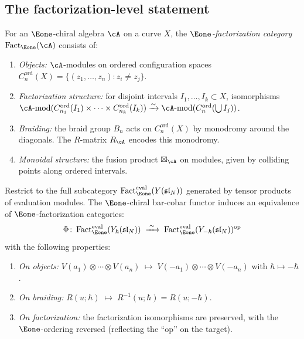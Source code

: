 \subsection{The factorization-level statement}

\begin{definition}
\label{def:e1-factorization-category}
For an $\Eone$-chiral algebra $\cA$ on a curve $X$, the
\emph{$\Eone$-factorization category}
$\operatorname{Fact}_{\Eone}(\cA)$ consists of:
\begin{enumerate}[label=\textup{(\roman*)}]
\item \emph{Objects:} $\cA$-modules on ordered configuration spaces
  $C_n^{\mathrm{ord}}(X) = \{(z_1, \ldots, z_n) : z_i \neq z_j\}$.
\item \emph{Factorization structure:} for disjoint intervals
  $I_1, \ldots, I_k \subset X$, isomorphisms
  $\cA\text{-mod}(C_{n_1}^{\mathrm{ord}}(I_1) \times \cdots
  \times C_{n_k}^{\mathrm{ord}}(I_k))
  \xrightarrow{\sim}
  \cA\text{-mod}(C_n^{\mathrm{ord}}(\bigcup I_j))$.
\item \emph{Braiding:} the braid group $B_n$ acts on
  $C_n^{\mathrm{ord}}(X)$ by monodromy around the diagonals.
  The $R$-matrix $R_\cA$ encodes this monodromy.
\item \emph{Monoidal structure:} the fusion product
  $\boxtimes_\cA$ on modules, given by colliding
  points along ordered intervals.
\end{enumerate}
\end{definition}

\begin{theorem}\label{thm:factorization-dk-eval}
Restrict to the full subcategory
$\operatorname{Fact}_{\Eone}^{\mathrm{eval}}(Y(\mathfrak{sl}_N))$
generated by tensor products of evaluation modules.  The
$\Eone$-chiral bar-cobar functor induces an equivalence of
$\Eone$-factorization categories:
\begin{equation}\label{eq:factorization-dk-eval}
\Phi \colon
\operatorname{Fact}_{\Eone}^{\mathrm{eval}}(Y_\hbar(\mathfrak{sl}_N))
\;\xrightarrow{\;\sim\;}\;
\operatorname{Fact}_{\Eone}^{\mathrm{eval}}
  (Y_{-\hbar}(\mathfrak{sl}_N))^{\mathrm{op}}
\end{equation}
with the following properties:
\begin{enumerate}[label=\textup{(\roman*)}]
\item \emph{On objects:} $V(a_1) \otimes \cdots \otimes V(a_n)
  \;\mapsto\; V(-a_1) \otimes \cdots \otimes V(-a_n)$
  with $\hbar \mapsto -\hbar$.
\item \emph{On braiding:}
  $R(u; \hbar) \;\mapsto\; R^{-1}(u; \hbar) = R(u; -\hbar)$.
\item \emph{On factorization:} the factorization isomorphisms
  are preserved, with the $\Eone$-ordering reversed
  \textup{(}reflecting the ``op'' on the target\textup{)}.
\end{enumerate}
\end{theorem}

